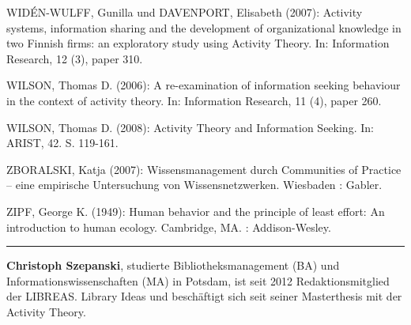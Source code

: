 \documentclass[a4paper,
fontsize=11pt,
oneside,
numbers=noperiodatend,
parskip=half-,
bibliography=totoc,
final
]{scrartcl}
\begin{document}
WIDÉN-WULFF, Gunilla und DAVENPORT, Elisabeth (2007): Activity systems,
information sharing and the development of organizational knowledge in
two Finnish firms: an exploratory study using Activity Theory. In:
Information Research, 12 (3), paper 310.

WILSON, Thomas D. (2006): A re-examination of information seeking
behaviour in the context of activity theory. In: Information Research,
11 (4), paper 260.

WILSON, Thomas D. (2008): Activity Theory and Information Seeking. In:
ARIST, 42. S. 119-161.

ZBORALSKI, Katja (2007): Wissensmanagement durch Communities of Practice
-- eine empirische Untersuchung von Wissensnetzwerken. Wiesbaden :
Gabler.

ZIPF, George K. (1949): Human behavior and the principle of least
effort: An introduction to human ecology. Cambridge, MA. :
Addison-Wesley.

\begin{center}\rule{0.5\linewidth}{\linethickness}\end{center}

\textbf{Christoph Szepanski}, studierte Bibliotheksmanagement (BA) und
Informationswissenschaften (MA) in Potsdam, ist seit 2012
Redaktionsmitglied der LIBREAS. Library Ideas und beschäftigt sich seit
seiner Masterthesis mit der Activity Theory.
\end{document}
